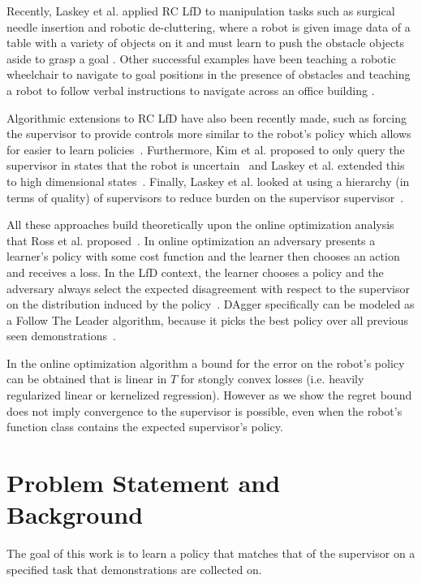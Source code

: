 \documentclass[10pt, conference]{ieeeconf}      %
\newcommand{\nc}{RC LfD }
\begin{document}
 Recently, Laskey et al. applied \nc to manipulation tasks such as surgical needle insertion \cite{laskeyshiv} and robotic de-cluttering, where a robot is given image data of a table with a variety of objects on it and must learn to push the obstacle objects aside to grasp a goal \cite{laskeyrobot}. Other successful examples have been teaching a robotic wheelchair to navigate to goal positions in the presence of obstacles and teaching a robot to follow verbal instructions to navigate across an office building \cite{kim2013maximum, duvallet2013imitation}. 

Algorithmic extensions to \nc have also been recently made, such as  forcing the supervisor to provide controls more similar to the robot's policy which allows for easier to learn policies~\cite{he2012imitation}. Furthermore, Kim et al. proposed to only query the supervisor in states that the robot is uncertain~\cite{kim2013maximum} and Laskey et al. extended this to high dimensional states~\cite{laskeyshiv}. Finally, Laskey et al. looked at using a hierarchy (in terms of quality) of supervisors to reduce burden on the supervisor supervisor~\cite{laskeyrobot}.

All these approaches build theoretically upon the online optimization analysis that Ross et al. proposed~\cite{ross2010reduction}. In online optimization an adversary presents a learner's policy with some cost function and the learner then chooses an action and receives a loss. In the LfD context, the learner chooses a policy and the adversary always select the expected disagreement with respect to the supervisor on the distribution induced by the policy~\cite{shalev2011online}. DAgger specifically can be modeled as a Follow The Leader algorithm, because it picks the best policy over all previous seen demonstrations~\cite{ross2010reduction}.

In the online optimization algorithm a bound for the error on the robot's policy can be obtained that is linear in $T$ for stongly convex losses (i.e. heavily regularized linear or kernelized regression). However as we show the regret bound does not imply convergence to the supervisor is possible, even when the robot's function class contains the expected supervisor's policy. 


\section{Problem Statement and Background}\label{sec:PS}
The goal of this work is to learn a policy that matches that of the supervisor on a specified task that demonstrations are collected on. 
\end{document}
